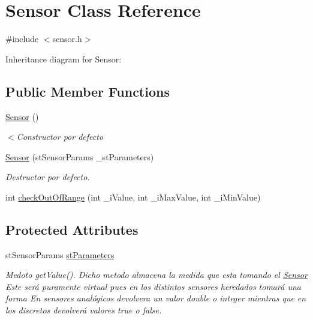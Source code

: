 \hypertarget{classSensor}{}\section{Sensor Class Reference}
\label{classSensor}


{\ttfamily \#include $<$sensor.\+h$>$}



Inheritance diagram for Sensor\+:
\subsection*{Public Member Functions}
\begin{DoxyCompactItemize}
\item 
\hyperlink{classSensor_a342d6d11ef572c8cba92cb76fb1a294b}{Sensor} ()
\begin{DoxyCompactList}\small\item\em $<$Constructor por defecto \end{DoxyCompactList}\item 
\hyperlink{classSensor_a852e9b06ce6e4a911105a8c388df1ce9}{Sensor} (st\+Sensor\+Params \+\_\+st\+Parameters)
\begin{DoxyCompactList}\small\item\em Destructor por defecto. \end{DoxyCompactList}\item 
int \hyperlink{classSensor_ab73adef0116c9ccc7c7fc67faf217ff6}{check\+Out\+Of\+Range} (int \+\_\+i\+Value, int \+\_\+i\+Max\+Value, int \+\_\+i\+Min\+Value)
\end{DoxyCompactItemize}
\subsection*{Protected Attributes}
\begin{DoxyCompactItemize}
\item 
st\+Sensor\+Params \hyperlink{classSensor_aecbcb46558e78b3f9bb0db37c76ced6b}{st\+Parameters}
\begin{DoxyCompactList}\small\item\em Medoto get\+Value(). Dicho metodo almacena la medida que esta tomando el \hyperlink{classSensor}{Sensor} Este será puramente virtual pues en los distintos sensores heredados tomará una forma En sensores analógicos devolvera un valor double o integer mientras que en los discretos devolverá valores true o false. \end{DoxyCompactList}\end{DoxyCompactItemize}


